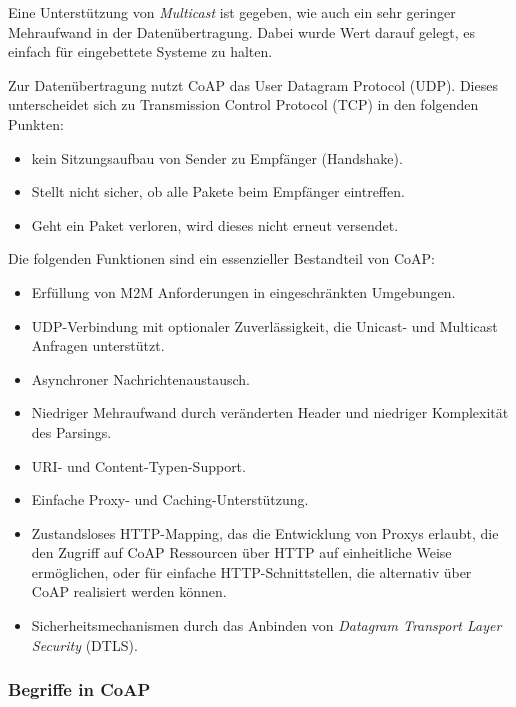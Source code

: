 Eine Unterstützung von \textit{Multicast} ist gegeben, wie auch ein sehr geringer Mehraufwand in der Datenübertragung. Dabei wurde Wert darauf gelegt, es einfach für eingebettete Systeme zu halten.

Zur Datenübertragung nutzt CoAP das User Datagram Protocol (UDP). Dieses unterscheidet sich zu Transmission Control Protocol (TCP) in den folgenden Punkten:
\begin{itemize}
    \item kein Sitzungsaufbau von Sender zu Empfänger (Handshake).
    \item Stellt nicht sicher, ob alle Pakete beim Empfänger eintreffen.
    \item Geht ein Paket verloren, wird dieses nicht erneut versendet.
\end{itemize}

Die folgenden Funktionen sind ein essenzieller Bestandteil von CoAP:
\begin{itemize}
    \item Erfüllung von M2M Anforderungen in eingeschränkten Umgebungen.
    \item UDP-Verbindung mit optionaler Zuverlässigkeit, die Unicast- und Multicast Anfragen unterstützt.
    \item Asynchroner Nachrichtenaustausch.
    \item Niedriger Mehraufwand durch veränderten Header und niedriger Komplexität des Parsings.
    \item URI- und Content-Typen-Support.
    \item Einfache Proxy- und Caching-Unterstützung.
    \item Zustandsloses HTTP-Mapping, das die Entwicklung von Proxys erlaubt, die den Zugriff auf CoAP Ressourcen über HTTP auf einheitliche Weise ermöglichen, oder für einfache HTTP-Schnittstellen, die alternativ über CoAP realisiert werden können.
    \item Sicherheitsmechanismen durch das Anbinden von \textit{Datagram Transport Layer Security} (DTLS).
\end{itemize}

\subsubsection{Begriffe in CoAP}
\label{subsubsec:begiffe-in-coap}

